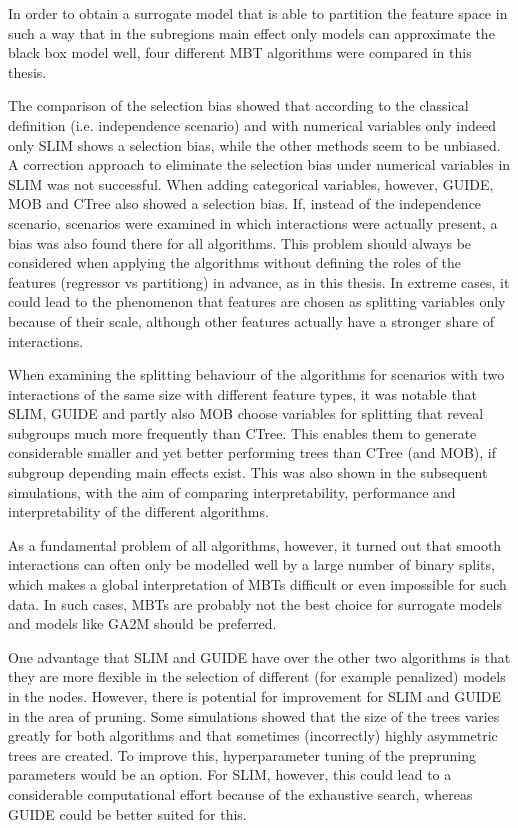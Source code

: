 In order to obtain a surrogate model that is able to partition the feature space in such a way that in the subregions main effect only models can approximate the black box model well, four different MBT algorithms were compared in this thesis.

The comparison of the selection bias showed that according to the classical definition (i.e. independence scenario) and with numerical variables only indeed only SLIM shows a selection bias, while the other methods seem to be unbiased. A correction approach to eliminate the selection bias under numerical variables in SLIM was not successful.
When adding categorical variables, however, GUIDE, MOB and CTree also showed a selection bias. If, instead of the independence scenario, scenarios were examined in which interactions were actually present, a bias was also found there for all algorithms.
This problem should always be considered when applying the algorithms without defining the roles of the features (regressor vs partitiong) in advance, as in this thesis. In extreme cases, it could lead to the phenomenon that features are chosen as splitting variables only because of their scale, although other features actually have a stronger share of interactions.

When examining the splitting behaviour of the algorithms for scenarios with two interactions of the same size with different feature types, it was notable that SLIM, GUIDE and partly also MOB choose variables for splitting that reveal subgroups much more frequently than CTree. This enables them to generate considerable smaller and yet better performing trees than CTree (and MOB), if subgroup depending main effects exist.
This was also shown in the subsequent simulations, with the aim of comparing interpretability, performance and interpretability of the different algorithms. 

As a fundamental problem of all algorithms, however, it turned out that smooth interactions can often only be modelled well by a large number of binary splits, which makes a global interpretation of MBTs difficult or even impossible for such data. In such cases, MBTs are probably not the best choice for surrogate models and models like GA2M \citep{Lou.2013} should be preferred.


One advantage that SLIM and GUIDE have over the other two algorithms is that they are more flexible in the selection of different (for example penalized) models in the nodes.
However, there is potential for improvement for SLIM and GUIDE in the area of pruning. Some simulations showed that the size of the trees varies greatly for both algorithms and that sometimes (incorrectly) highly asymmetric trees are created. To improve this, hyperparameter tuning of the prepruning parameters would be an option. For SLIM, however, this could lead to a considerable computational effort because of the exhaustive search, whereas GUIDE could be better suited for this.

